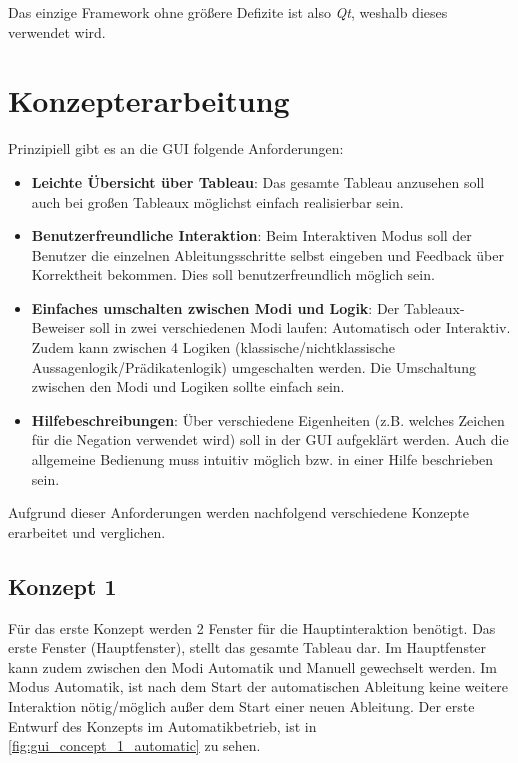 Das einzige Framework ohne größere Defizite ist also \textit{Qt}, weshalb dieses verwendet wird.

\section{Konzepterarbeitung}
Prinzipiell gibt es an die \ac{GUI} folgende Anforderungen:
\begin{itemize}
\item \textbf{Leichte Übersicht über Tableau}: Das gesamte Tableau anzusehen soll auch bei großen Tableaux möglichst einfach realisierbar sein.

\item \textbf{Benutzerfreundliche Interaktion}: Beim Interaktiven Modus soll der Benutzer die einzelnen Ableitungsschritte selbst eingeben und Feedback über Korrektheit bekommen. Dies soll benutzerfreundlich möglich sein.

\item \textbf{Einfaches umschalten zwischen Modi und Logik}: Der Tableaux-Beweiser soll in zwei verschiedenen Modi laufen: Automatisch oder Interaktiv. Zudem kann zwischen 4 Logiken (klassische/nichtklassische Aussagenlogik/Prädikatenlogik) umgeschalten werden. Die Umschaltung zwischen den Modi und Logiken sollte einfach sein.

\item \textbf{Hilfebeschreibungen}: Über verschiedene Eigenheiten (z.B. welches Zeichen für die Negation verwendet wird) soll in der \ac{GUI} aufgeklärt werden. Auch die allgemeine Bedienung muss intuitiv möglich bzw. in einer Hilfe beschrieben sein.
\end{itemize}

Aufgrund dieser Anforderungen werden nachfolgend verschiedene Konzepte erarbeitet und verglichen.

\subsection{Konzept 1\label{sec:concept_1}}
Für das erste Konzept werden 2 Fenster für die Hauptinteraktion benötigt. Das erste Fenster (Hauptfenster), stellt das gesamte Tableau dar. Im Hauptfenster kann zudem zwischen den Modi Automatik und Manuell gewechselt werden. Im Modus Automatik, ist nach dem Start der automatischen Ableitung keine weitere Interaktion nötig/möglich außer dem Start einer neuen Ableitung. Der erste Entwurf des Konzepts im Automatikbetrieb, ist in \autoref{fig:gui_concept_1_automatic} zu sehen.

